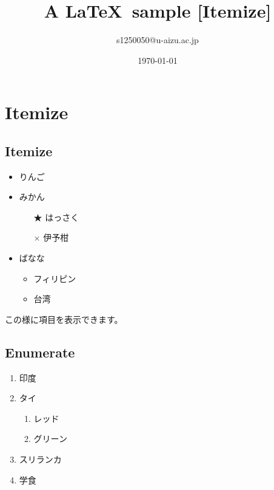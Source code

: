 \documentclass[a4paper]{jarticle}
\title{A \LaTeX ~sample [Itemize]}
\author{s1250050@u-aizu.ac.jp}
\date{\today}
\begin{document}
\maketitle
\section{Itemize}
\subsection{Itemize}
\begin{itemize}
\item りんご
\item みかん
\begin{itemize}
	\item[★] はっさく
	\item[×] 伊予柑
\end{itemize}
\item ばなな
\begin{itemize}
	\item フィリピン
	\item 台湾
\end{itemize}
\end{itemize}
この様に項目を表示できます。

\subsection{Enumerate}
\begin{enumerate}
	\item 印度
	\item タイ
	\begin{enumerate}
		\item レッド
		\item グリーン
	\end{enumerate}
	\item スリランカ
	\item 学食
\end{enumerate}
\end{document}
